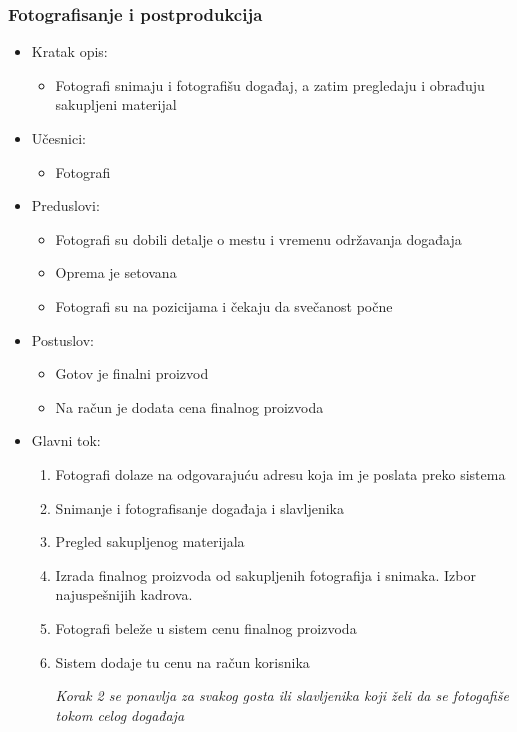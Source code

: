 \documentclass[a4paper]{article}
\begin{document}
\subsubsection{Fotografisanje i postprodukcija}
\begin{itemize}
    \item Kratak opis: 
    \begin{itemize}
        \item Fotografi snimaju i fotografišu događaj, a zatim pregledaju i obrađuju sakupljeni materijal
    \end{itemize}
    \item Učesnici:
        \begin{itemize}
        \item Fotografi
    \end{itemize}
    \item Preduslovi:
        \begin{itemize}
            \item Fotografi su dobili detalje o mestu i vremenu održavanja događaja
            \item Oprema je setovana
            \item Fotografi su na pozicijama i čekaju da svečanost počne
        \end{itemize}
    \item Postuslov:
        \begin{itemize}
            \item Gotov je finalni proizvod
            \item Na račun je dodata cena finalnog proizvoda
            \end{itemize}
    \item Glavni tok:
        \begin{enumerate}
            \item Fotografi dolaze na odgovarajuću adresu koja im je poslata preko sistema
            \item Snimanje i fotografisanje događaja i slavljenika
            \item Pregled sakupljenog materijala
             \item Izrada finalnog proizvoda od sakupljenih fotografija i snimaka. Izbor najuspešnijih kadrova. 
            \item Fotografi beleže u sistem cenu finalnog proizvoda
            \item Sistem dodaje tu cenu na račun korisnika
            
            \textit{Korak 2 se ponavlja za svakog gosta ili slavljenika koji želi da se fotogafiše tokom celog događaja}
            

\end{enumerate}
\end{itemize}
\end{document}
